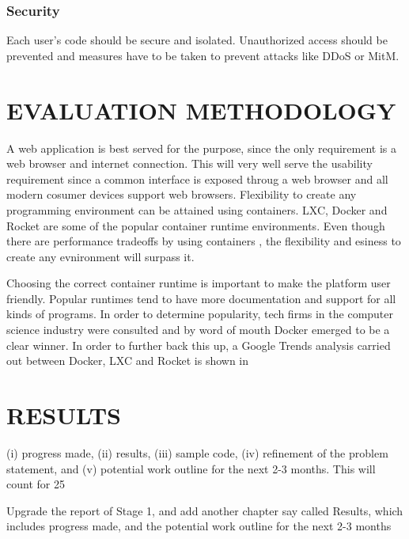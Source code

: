 \documentclass[DD]{iitmdiss}
\begin{document}
\subsection{Security}
Each user's code should be secure and isolated. Unauthorized access should be prevented and measures have to be taken to prevent attacks like DDoS or MitM.

\chapter{EVALUATION METHODOLOGY}

A web application is best served for the purpose, since the only requirement is a web browser and internet connection. This will very well serve the usability requirement since a common interface is exposed throug a web browser and all modern cosumer devices support web browsers. Flexibility to create any programming environment can be attained using containers. LXC, Docker and Rocket are some of the popular container runtime environments. Even though there are performance tradeoffs by using containers \citep{ruan_performance_2016}, the flexibility and esiness to create any evnironment will surpass it.


Choosing the correct container runtime is important to make the platform user friendly. Popular runtimes tend to have more documentation and support for all kinds of programs. In order to determine popularity, tech firms in the computer science industry were consulted and by word of mouth Docker emerged to be a clear winner. In order to further back this up, a Google Trends analysis carried out between Docker, LXC and Rocket \citep{google_trends_docker_lxc_rkt} is shown in 



\chapter{RESULTS}
(i) progress made, (ii) results, (iii) sample code, (iv) refinement of the problem statement, and (v) potential work outline for the next 2-3 months. This will count for 25%

Upgrade the report of Stage 1, and add another chapter say called Results, which includes progress made, and the potential work outline for the next 2-3 months
\end{document}
